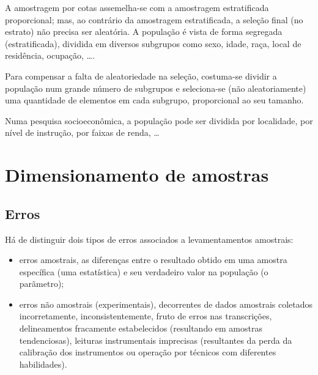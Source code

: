 \documentclass[
]{book}
\providecommand{\tightlist}{%
  \setlength{\itemsep}{0pt}\setlength{\parskip}{0pt}}
\begin{document}
\hfill\break

A amostragem por cotas assemelha-se com a amostragem estratificada proporcional; mas, ao contrário da amostragem estratificada, a seleção final (no estrato) não precisa ser aleatória. A população é vista de forma segregada (estratificada), dividida em diversos subgrupos como sexo, idade, raça, local de residência, ocupação, \ldots.

\hfill\break

Para compensar a falta de aleatoriedade na seleção, costuma-se dividir a população num grande número de subgrupos e seleciona-se (não aleatoriamente) uma quantidade de elementos em cada subgrupo, proporcional ao seu tamanho.

\hfill\break

Numa pesquisa socioeconômica, a população pode ser dividida por localidade, por nível de instrução, por faixas de renda, \ldots{}

\hfill\break

\hypertarget{dimensionamento-de-amostras}{%
\section{Dimensionamento de amostras}\label{dimensionamento-de-amostras}}

\hypertarget{erros}{%
\subsection{Erros}\label{erros}}

\hfill\break

Há de distinguir dois tipos de erros associados a levamentamentos amostrais:

\hfill\break

\begin{itemize}
\tightlist
\item
  erros amostrais, as diferenças entre o resultado obtido em uma amostra específica (uma estatística) e seu verdadeiro valor na população (o parãmetro);\\
\item
  erros não amostrais (experimentais), decorrentes de dados amostrais coletados incorretamente, inconsistentemente, fruto de erros nas transcrições, delineamentos fracamente estabelecidos (resultando em amostras tendenciosas), leituras instrumentais imprecisas (resultantes da perda da calibração dos instrumentos ou operação por técnicos com diferentes habilidades).
\end{itemize}
\end{document}
